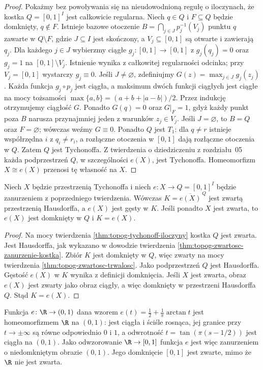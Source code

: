 \begin{proof}
Pokażmy bez powoływania się na nieudowodnioną
regułę o iloczynach, że kostka $Q=[0,1]^I$
jest całkowicie regularna. Niech $q\in Q$ i
$F\subseteq Q$ będzie domknięty, $q\notin F$.
Istnieje bazowe otoczenie
$B=\bigcap_{j\in J}p_j^{-1}(V_j)$ punktu $q$
zawarte w $Q\setminus F$, gdzie $J\subseteq I$
jest skończony, a $V_j\subseteq[0,1]$ są otwarte
i zawierają $q_j$.
Dla każdego $j\in J$ wybierzmy ciągłe
$g_j\colon[0,1]\to[0,1]$ z $g_j(q_j)=0$
oraz $g_j=1$ na $[0,1]\setminus V_j$.
Istnienie wynika z całkowitej regularności odcinka;
przy $V_j=[0,1]$ wystarczy $g_j\equiv0$.
Jeśli $J\ne\varnothing$, zdefiniujmy
$G(z)=\max_{j\in J}g_j(z_j)$.
Każda funkcja $g_j\circ p_j$ jest ciągła,
a maksimum dwóch funkcji ciągłych jest ciągłe
na mocy tożsamości
$\max\{a,b\}=(a+b+|a-b|)/2$.
Przez indukcję otrzymujemy ciągłość $G$.
Ponadto $G(q)=0$ oraz $G|_F=1$,
gdyż każdy punkt poza $B$ narusza przynajmniej
jeden z warunków $z_j\in V_j$.
Jeśli $J=\varnothing$, to $B=Q$ oraz
$F=\varnothing$; wówczas weźmy $G\equiv0$.
Ponadto $Q$ jest $T_1$: dla $q\ne r$ istnieje
współrzędna $i$ z $q_i\ne r_i$, a rozłączne
otoczenia w $[0,1]$ dają rozłączne otoczenia
w $Q$. Zatem $Q$ jest Tychonoffa.
Z twierdzenia o dziedziczeniu z rozdziału~05
każda podprzestrzeń $Q$, w szczególności $e(X)$,
jest Tychonoffa. Homeomorfizm
$X\cong e(X)$ przenosi tę własność na $X$.
\end{proof}

\begin{wniosek}
\label{cor:topog-zwartosc-uzwarcenie}
Niech $X$ będzie przestrzenią Tychonoffa i niech
$e\colon X\to Q=[0,1]^I$ będzie zanurzeniem
z poprzedniego twierdzenia. Wówczas
$K=\overline{e(X)}^{\,Q}$ jest zwartą przestrzenią
Hausdorffa, a $e(X)$ jest gęsty w $K$.
Jeśli ponadto $X$ jest zwarta, to $e(X)$ jest
domknięty w $Q$ i $K=e(X)$.
\end{wniosek}
\begin{proof}
Na mocy twierdzenia \ref{thm:topog-tychonoff-iloczyny}
kostka $Q$ jest zwarta. Jest Hausdorffa,
jak wykazano w dowodzie twierdzenia
\ref{thm:topog-zwartosc-zanurzenie-kostka}.
Zbiór $K$ jest domknięty w $Q$, więc zwarty
na mocy twierdzenia \ref{thm:topog-zwartosc-trwalosc}.
Jako podprzestrzeń $Q$ jest Hausdorffa.
Gęstość $e(X)$ w $K$ wynika z definicji domknięcia.
Jeśli $X$ jest zwarta, obraz $e(X)$ jest zwarty
jako obraz ciągły, a więc domknięty w
przestrzeni Hausdorffa $Q$. Stąd $K=e(X)$.
\end{proof}

\begin{przyklad}
\label{ex:topog-zwartosc-uzwarcenie-odcinka}
Funkcja $e\colon\R\to(0,1)$ dana wzorem
$e(t)=\tfrac12+\tfrac{1}{\pi}\arctan t$
jest homeomorfizmem $\R$ na $(0,1)$:
jest ciągła i ściśle rosnąca, jej granice przy
$t\to\pm\infty$ są równe odpowiednio $0$ i $1$,
a odwrotność $t=\tan(\pi(s-1/2))$ jest ciągła
na $(0,1)$. Jako odwzorowanie $\R\to[0,1]$ funkcja $e$ jest
więc zanurzeniem o niedomkniętym obrazie $(0,1)$.
Jego domknięcie $[0,1]$ jest zwarte,
mimo że $\R$ nie jest zwarta.
\end{przyklad}

